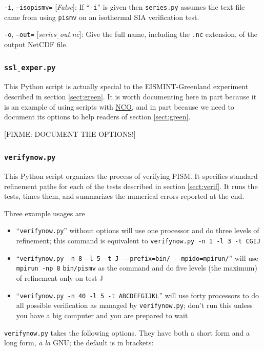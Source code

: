 \documentclass[11pt,final]{amsart}
\newcommand{\optoptdef}[3]{\vspace{1mm}\noindent \large\texttt{-#1},\,\,\texttt{--#2=}\normalsize\,\,[\textsl{#3}]:\quad}
\newcommand{\und}{$\underline{\,\,\,}$}
\begin{document}
\optoptdef{i}{isopismv}{False} If ``\verb|-i|'' is given then \verb|series.py| assumes the text file came from using \verb|pismv| on an isothermal SIA verification test.

\optoptdef{o}{out}{series\und out.nc} Give the full name, including the \verb|.nc| extension, of the output NetCDF file.



\subsubsection*{\Large{\texttt{ssl\und exper.py}}}  This Python script is actually special to the EISMINT-Greenland experiment described in section \ref{sect:green}.  It is worth documenting here in part because it is an example of using scripts with \href{http://nco.sourceforge.net/}{NCO}, and in part because we need to document its options to help readers of section \ref{sect:green}.

[FIXME: DOCUMENT THE OPTIONS!]


\subsubsection*{\Large{\texttt{verifynow.py}}}  This Python script organizes the process of verifying PISM.  It specifies standard refinement paths for each of the tests described in section \ref{sect:verif}.  It runs the tests, times them, and summarizes the numerical errors reported at the end.

Three example usages are \begin{itemize}
\item ``\verb|verifynow.py|'' without options will use one processor and do three levels of refinement; this command is equivalent to \verb|verifynow.py -n 1 -l 3 -t CGIJ|
\item ``\verb|verifynow.py -n 8 -l 5 -t J --prefix=bin/ --mpido=mpirun/|'' will use \verb|mpirun -np 8| \verb|bin/pismv| as the command and do five levels (the maximum) of refinement only on test J
\item ``\verb|verifynow.py -n 40 -l 5 -t ABCDEFGIJKL|'' will use forty processors to do all possible verification as managed by \verb|verifynow.py|; don't run this unless you have a big computer and you are prepared to wait
\end{itemize}

\verb|verifynow.py| takes the following options.  They have both a short form and a long form, \emph{a la} GNU; the default is in brackets:
\end{document}
